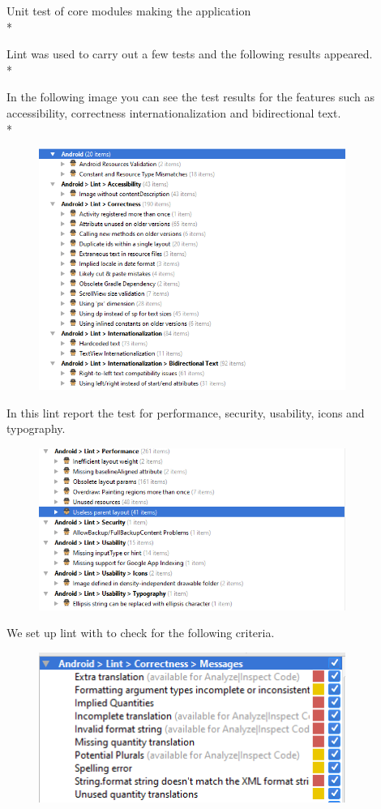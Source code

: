 Unit test of core modules making the application\\*

Lint was used to carry out a few tests and the following results appeared.\\*

In the following image you can see the test results for the features such as accessibility, correctness internationalization and bidirectional text.
\\*

\begin{figure}[H]
  		\centering
      	\includegraphics[width=100mm]{Capture1}	      	
  		\caption{}
\end{figure}

In this lint report the test for performance, security, usability, icons and typography.

\begin{figure}[H]
  		\centering
      	\includegraphics[width=100mm]{Capture2}	      	
  		\caption{}
\end{figure}

We set up lint with to check for the following criteria. 

\begin{figure}[H]
  		\centering
      	\includegraphics[width=100mm]{Capture4}	      	
  		\caption{}
\end{figure}

